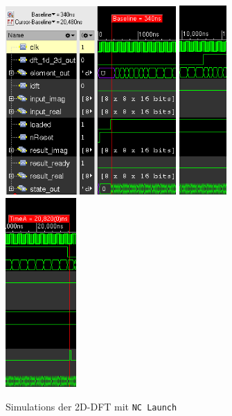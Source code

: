  \begin{figure}[htbp]
  \centering
  \includegraphics[width=0.58\textwidth]{img/Simulationsdauer_Anfang.png}
  \hfill
  \includegraphics[width=0.161\textwidth]{img/Simulationsdauer_Mitte.png}
  \hfill
  \includegraphics[width=0.241\textwidth]{img/Simulationsdauer_Ende.png}
  \caption{Simulations der 2D-DFT mit \texttt{NC Launch}}
  \label{pic:Simulationsdauer}
 \end{figure}

